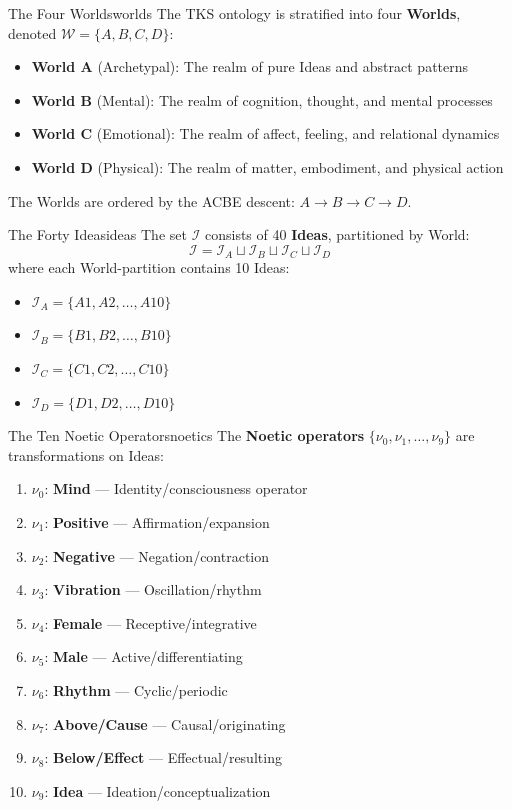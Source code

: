 \documentclass[11pt,twoside,openright]{book}
\theoremstyle{definition}
\theoremstyle{plain}
\theoremstyle{remark}
\newcommand{\Worlds}{\mathcal{W}}
\newcommand{\Ideas}{\mathcal{I}}
\begin{document}
\begin{definitionbox*}{The Four Worlds}{worlds}
The TKS ontology is stratified into four \textbf{Worlds}, denoted $\Worlds = \{A, B, C, D\}$:
\begin{itemize}
    \item \textbf{World A} (Archetypal): The realm of pure Ideas and abstract patterns
    \item \textbf{World B} (Mental): The realm of cognition, thought, and mental processes
    \item \textbf{World C} (Emotional): The realm of affect, feeling, and relational dynamics
    \item \textbf{World D} (Physical): The realm of matter, embodiment, and physical action
\end{itemize}
The Worlds are ordered by the ACBE descent: $A \to B \to C \to D$.
\end{definitionbox*}

\begin{definitionbox*}{The Forty Ideas}{ideas}
The set $\Ideas$ consists of 40 \textbf{Ideas}, partitioned by World:
\[
\Ideas = \Ideas_A \sqcup \Ideas_B \sqcup \Ideas_C \sqcup \Ideas_D
\]
where each World-partition contains 10 Ideas:
\begin{itemize}
    \item $\Ideas_A = \{A1, A2, \ldots, A10\}$
    \item $\Ideas_B = \{B1, B2, \ldots, B10\}$
    \item $\Ideas_C = \{C1, C2, \ldots, C10\}$
    \item $\Ideas_D = \{D1, D2, \ldots, D10\}$
\end{itemize}
\end{definitionbox*}

\begin{definitionbox*}{The Ten Noetic Operators}{noetics}
The \textbf{Noetic operators} $\{\nu_0, \nu_1, \ldots, \nu_9\}$ are transformations on Ideas:
\begin{enumerate}[label=(\arabic*)]
    \item $\nu_0$: \textbf{Mind} --- Identity/consciousness operator
    \item $\nu_1$: \textbf{Positive} --- Affirmation/expansion
    \item $\nu_2$: \textbf{Negative} --- Negation/contraction
    \item $\nu_3$: \textbf{Vibration} --- Oscillation/rhythm
    \item $\nu_4$: \textbf{Female} --- Receptive/integrative
    \item $\nu_5$: \textbf{Male} --- Active/differentiating
    \item $\nu_6$: \textbf{Rhythm} --- Cyclic/periodic
    \item $\nu_7$: \textbf{Above/Cause} --- Causal/originating
    \item $\nu_8$: \textbf{Below/Effect} --- Effectual/resulting
    \item $\nu_9$: \textbf{Idea} --- Ideation/conceptualization
\end{enumerate}
\end{definitionbox*}
\end{document}
